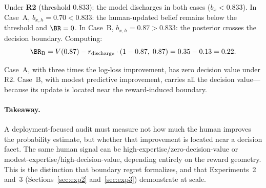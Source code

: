 Under \textbf{R2} (threshold $0.833$): the model discharges in both cases ($b_x < 0.833$).
In Case~A, $b_{x,h} = 0.70 < 0.833$: the human-updated belief remains below the threshold and $\BR = 0$.
In Case~B, $b_{x,h} = 0.87 > 0.833$: the posterior crosses the decision boundary.
Computing:
\[
  \BR_{\text{B}} = V(0.87) - r_{\text{discharge}} \cdot (1 - 0.87, \; 0.87)
  = 0.35 - 0.13 = 0.22.
\]

\noindent
Case~A, with three times the log-loss improvement, has zero decision value under R2.
Case~B, with modest predictive improvement, carries all the decision value---because its update is located near the reward-induced boundary.

\paragraph{Takeaway.}
A deployment-focused audit must measure not how much the human improves the probability estimate, but whether that improvement is located near a decision facet.
The same human signal can be high-expertise/zero-decision-value or modest-expertise/high-decision-value, depending entirely on the reward geometry.
This is the distinction that boundary regret formalizes, and that Experiments~2 and~3 (Sections~\ref{sec:exp2} and~\ref{sec:exp3}) demonstrate at scale.
